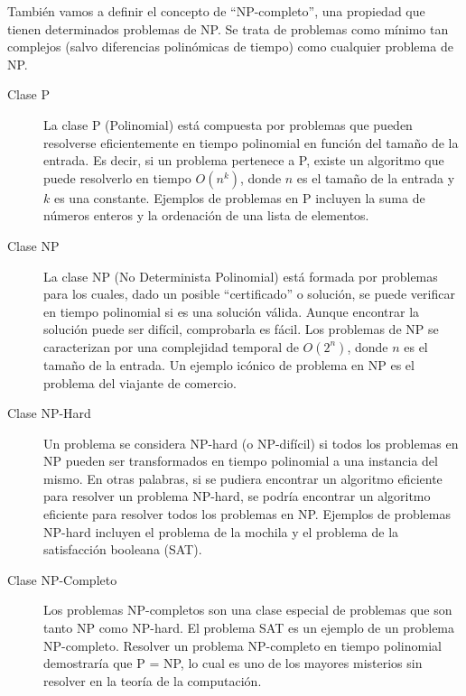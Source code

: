 También vamos a definir el concepto de ``NP-completo'', una propiedad que tienen determinados problemas de NP. Se trata de problemas como mínimo tan complejos (salvo diferencias polinómicas de tiempo) como cualquier problema de NP.

\begin{description}
\item[Clase P] La clase P (Polinomial) está compuesta por problemas que pueden resolverse eficientemente en tiempo polinomial en función del tamaño de la entrada. Es decir, si un problema pertenece a P, existe un algoritmo que puede resolverlo en tiempo $O(n^k)$, donde $n$ es el tamaño de la entrada y $k$ es una constante. Ejemplos de problemas en P incluyen la suma de números enteros y la ordenación de una lista de elementos.

\item[Clase NP] La clase NP (No Determinista Polinomial) está formada por problemas para los cuales, dado un posible ``certificado'' o solución, se puede verificar en tiempo polinomial si es una solución válida. Aunque encontrar la solución puede ser difícil, comprobarla es fácil. Los problemas de NP se caracterizan por una complejidad temporal de $O(2^n)$, donde $n$ es el tamaño de la entrada. Un ejemplo icónico de problema en NP es el problema del viajante de comercio.

\item[Clase NP-Hard] Un problema se considera NP-hard (o NP-difícil) si todos los problemas en NP pueden ser transformados en tiempo polinomial a una instancia del mismo. En otras palabras, si se pudiera encontrar un algoritmo eficiente para resolver un problema NP-hard, se podría encontrar un algoritmo eficiente para resolver todos los problemas en NP. Ejemplos de problemas NP-hard incluyen el problema de la mochila y el problema de la satisfacción booleana (SAT).

\item[Clase NP-Completo] Los problemas NP-completos son una clase especial de problemas que son tanto NP como NP-hard. El problema SAT es un ejemplo de un problema NP-completo. Resolver un problema NP-completo en tiempo polinomial demostraría que P = NP, lo cual es uno de los mayores misterios sin resolver en la teoría de la computación.

\end{description}

